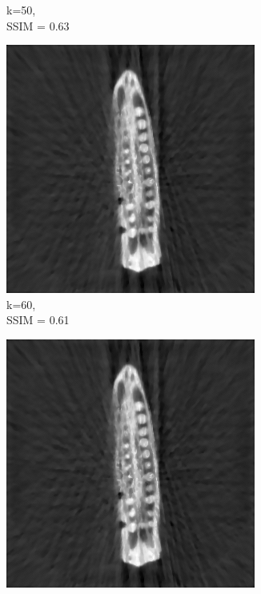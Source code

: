 \documentclass[journal]{IEEEtran}
\begin{document}
\begin{figure}[h]
\begin{subfigure}[b]{0.24\linewidth}
        \caption{k=50,\\ SSIM = 0.63}
     \end{subfigure}
   \begin{subfigure}[b]{0.24\linewidth}
        \includegraphics[width=\textwidth]{../images/okra/post_TCI/2D/48_views/tuning_k/weighted_prior_kk_60_lambda_prior_0.700000.png}
        \caption{k=60,\\ SSIM = 0.61}
     \end{subfigure}
   \begin{subfigure}[b]{0.24\linewidth}
        \includegraphics[width=\textwidth]{../images/okra/post_TCI/2D/48_views/tuning_k/weighted_prior_kk_70_lambda_prior_0.700000.png}

\end{subfigure}
\end{figure}
\end{document}
